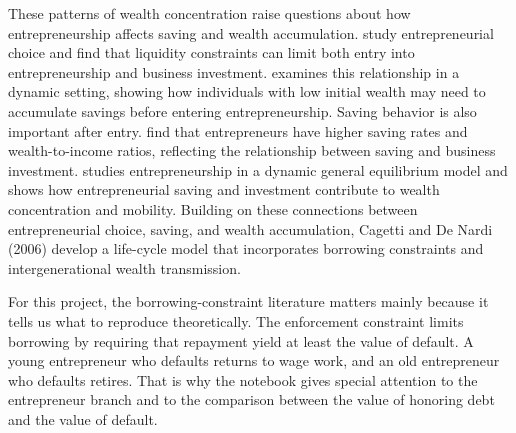 \documentclass[\latexroot/\projectname]{subfiles}
\begin{document}
These patterns of wealth concentration raise questions about how entrepreneurship affects saving and wealth accumulation. \cite{Evans1989-ws} study entrepreneurial choice and find that liquidity constraints can limit both entry into entrepreneurship and business investment. \cite{Buera2006-wj} examines this relationship in a dynamic setting, showing how individuals with low initial wealth may need to accumulate savings before entering entrepreneurship. Saving behavior is also important after entry. \cite{Gentry2004-rj} find that entrepreneurs have higher saving rates and wealth-to-income ratios, reflecting the relationship between saving and business investment. \cite{Quadrini2000-mp} studies entrepreneurship in a dynamic general equilibrium model and shows how entrepreneurial saving and investment contribute to wealth concentration and mobility. Building on these connections between entrepreneurial choice, saving, and wealth accumulation, Cagetti and De Nardi (2006) develop a life-cycle model that incorporates borrowing constraints and intergenerational wealth transmission.

For this project, the borrowing-constraint literature matters mainly because it tells us what to reproduce theoretically. The enforcement constraint limits borrowing by requiring that repayment yield at least the value of default. A young entrepreneur who defaults returns to wage work, and an old entrepreneur who defaults retires. That is why the notebook gives special attention to the entrepreneur branch and to the comparison between the value of honoring debt and the value of default.

\smartbib
\end{document}

